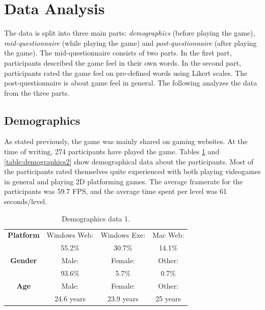 \section{Data Analysis} \label{data}
The data is split into three main parts: \textit{demographics} (before playing the game), \textit{mid-questionnaire} (while playing the game) and \textit{post-questionnaire} (after playing the game). The mid-questionnaire consists of two parts. In the first part, participants described the game feel in their own words. In the second part, participants rated the game feel on pre-defined words using Likert scales. The post-questionnaire is about game feel in general. The following analyzes the data from the three parts.

\subsection{Demographics}
As stated previously, the game was mainly shared on gaming websites. At the time of writing, 274 participants have played the game. Tables \ref{table:demographics1} and \ref{table:demographics2} show demographical data about the participants. Most of the participants rated themselves quite experienced with both playing videogames in general and playing 2D platforming games. The average framerate for the participants was 59.7 FPS, and the average time spent per level was 61 seconds/level.

\begin{table} \centering
\small
\caption{Demographics data 1.}
\label{table:demographics1}
\renewcommand{\arraystretch}{1.2}
\begin{tabular}{cccc}
\toprule
\textbf{Platform} & Windows Web: & Windows Exe: & Mac Web: \\
                  & 55.2\%      & 30.7\%      & 14.1\%  \\
\textbf{Gender}   & Male:        & Female:      & Other:   \\
                  & 93.6\%      & 5.7\%       & 0.7\%   \\
\textbf{Age}      & Male:     & Female:            & Other:        \\
                  & 24.6 years  & 23.9 years           & 25 years        \\
\bottomrule
\end{tabular}
\end{table}

